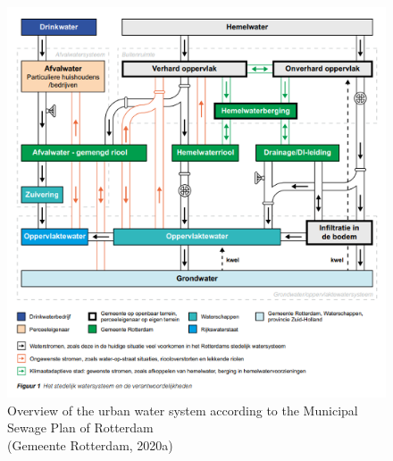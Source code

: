 \begin{figure}[htbp]
    \centering
    \includegraphics[width=0.75\linewidth]{figures/figures theory/rotterdam2020a.png}
    \caption{Overview of the urban water system according to the Municipal Sewage Plan of Rotterdam \\(Gemeente Rotterdam, 2020a)}
\end{figure}

\\
